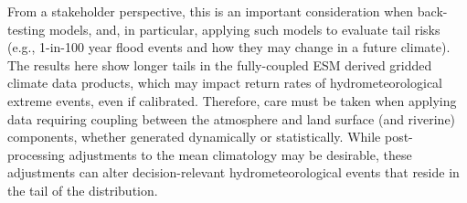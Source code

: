 \documentclass[draft]{agujournal2019}
\begin{document}
From a stakeholder perspective, this is an important consideration when back-testing models, and, in particular, applying such models to evaluate tail risks (e.g., 1-in-100 year flood events and how they may change in a future climate). 
The results here show longer tails in the fully-coupled ESM derived gridded climate data products, which may impact return rates of hydrometeorological extreme events, even if calibrated. 
Therefore, care must be taken when applying data requiring coupling between the atmosphere and land surface (and riverine) components, whether generated dynamically or statistically. 
While post-processing adjustments to the mean climatology may be desirable, these adjustments can alter decision-relevant hydrometeorological events that reside in the tail of the distribution.







%
%
%
%
%
%
%
%
%
%
\end{document}
